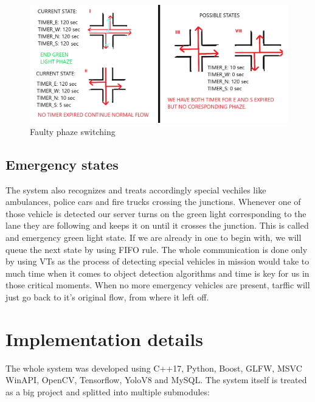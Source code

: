 \documentclass[17pt]{report}
\begin{document}
\begin{figure}[h!]
    \includegraphics[width=\textwidth]{Sketches/PhazeSwitchingCaseToBeAvoided.png}
    \caption{Faulty phaze switching}
    \label{fig:FaultyPhazeSwitching}
\end{figure}

\section{Emergency states}
\indent \indent
The system also recognizes and treats accordingly
special vechiles like ambulances, police cars and fire trucks
crossing the junctions. Whenever one of those vehicle is detected
our server turns on the green light corresponding to the lane they are
following and keeps it on until it crosses the junction. This is called 
and emergency green light state. If we are already
in one to begin with, we will queue the next state by using FIFO rule.
The whole communication is done only by using VTs as the process of detecting 
special vehicles in mission would take to much time when it comes to object 
detection algorithms and time is key for us in those critical moments.
When no more emergency vehicles are present, tarffic will just go 
back to it's original flow, from where it left off.

\pagebreak



\chapter{Implementation details}
\indent \indent
The whole system was developed using C++17, Python, Boost, GLFW, MSVC WinAPI, OpenCV,
Tensorflow, YoloV8 and MySQL. The system itself is treated as a big project 
and splitted into multiple submodules: 
\end{document}
